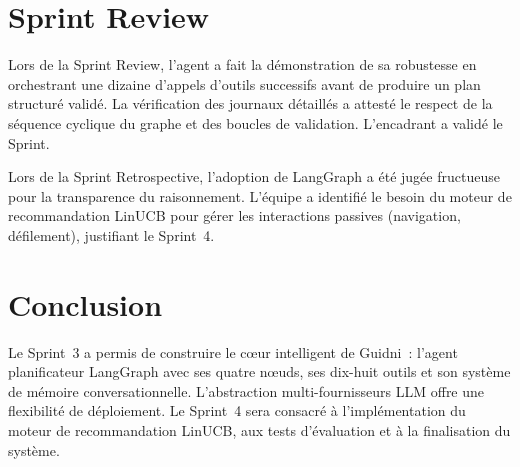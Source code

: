 \section{Sprint Review}

Lors de la Sprint Review, l'agent a fait la démonstration de sa robustesse en orchestrant une
dizaine d'appels d'outils successifs avant de produire un plan structuré validé. La
vérification des journaux détaillés a attesté le respect de la séquence cyclique du graphe et
des boucles de validation. L'encadrant a validé le Sprint.

Lors de la Sprint Retrospective, l'adoption de LangGraph a été jugée fructueuse pour la
transparence du raisonnement. L'équipe a identifié le besoin du moteur de recommandation
LinUCB pour gérer les interactions passives (navigation, défilement), justifiant le Sprint~4.


\section*{Conclusion}

Le Sprint~3 a permis de construire le cœur intelligent de Guidni~: l'agent planificateur
LangGraph avec ses quatre nœuds, ses dix-huit outils et son système de mémoire
conversationnelle. L'abstraction multi-fournisseurs LLM offre une flexibilité de déploiement.
Le Sprint~4 sera consacré à l'implémentation du moteur de recommandation LinUCB, aux tests
d'évaluation et à la finalisation du système.
